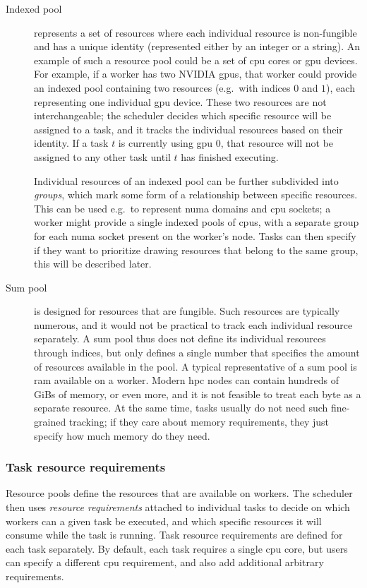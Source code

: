 \begin{description}
	\item [Indexed pool] represents a set of resources where each individual resource is
	      non-fungible and has a unique identity (represented either by an integer or a string). An example
	      of such a resource pool could be a set of \gls{cpu} cores or \gls{gpu}
	      devices. For example, if a worker has two NVIDIA \glspl{gpu}, that worker could provide
	      an indexed pool containing two resources (e.g.\ with indices $0$ and
	      $1$), each representing one individual \gls{gpu} device. These two
	      resources are not interchangeable; the scheduler decides which specific resource will be assigned
	      to a task, and it tracks the individual resources based on their identity. If a task
	      $t$ is currently using \gls{gpu} $0$, that
	      resource will not be assigned to any other task until $t$ has finished executing.

	      Individual resources of an indexed pool can be further subdivided into \emph{groups},
	      which mark some form of a relationship between specific resources. This can be used e.g.\ to
	      represent \gls{numa} domains and \gls{cpu} sockets; a worker might provide
	      a single indexed pools of \glspl{cpu}, with a separate group for each
	      \gls{numa} socket present on the worker's node. Tasks can then specify if they want to
	      prioritize drawing resources that belong to the same group, this will be described later.
	\item [Sum pool] is designed for resources that are fungible. Such resources are typically
	      numerous, and it would not be practical to track each individual resource separately. A sum pool
	      thus does not define its individual resources through indices, but only defines a single number
	      that specifies the amount of resources available in the pool. A typical representative of a sum
	      pool is \gls{ram} available on a worker. Modern \gls{hpc} nodes can
	      contain hundreds of GiBs of memory, or even more, and it is not feasible to treat each byte
	      as a separate resource. At the same time, tasks usually do not need such fine-grained tracking;
	      if they care about memory requirements, they just specify how much memory do they need.
\end{description}


\subsubsection*{Task resource requirements}
Resource pools define the resources that are available on workers. The scheduler then uses
\emph{resource requirements} attached to individual tasks to decide on which workers can a given task be
executed, and which specific resources it will consume while the task is running. Task resource
requirements are defined for each task separately. By default, each task requires a single
\gls{cpu} core, but users can specify a different \gls{cpu}
requirement, and also add additional arbitrary requirements.

